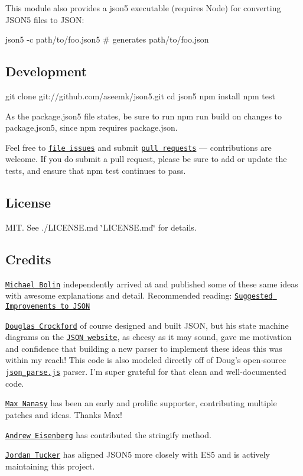 This module also provides a {\ttfamily json5} executable (requires Node) for converting J\+S\+O\+N5 files to J\+S\+ON\+:


\begin{DoxyCode}
json5 -c path/to/foo.json5    # generates path/to/foo.json
\end{DoxyCode}


\subsection*{Development}


\begin{DoxyCode}
git clone git://github.com/aseemk/json5.git
cd json5
npm install
npm test
\end{DoxyCode}


As the {\ttfamily package.\+json5} file states, be sure to run {\ttfamily npm run build} on changes to {\ttfamily package.\+json5}, since npm requires {\ttfamily package.\+json}.

Feel free to \href{https://github.com/aseemk/json5/issues}{\tt file issues} and submit \href{https://github.com/aseemk/json5/pulls}{\tt pull requests} — contributions are welcome. If you do submit a pull request, please be sure to add or update the tests, and ensure that {\ttfamily npm test} continues to pass.

\subsection*{License}

M\+IT. See ./\+L\+I\+C\+E\+N\+SE.md \char`\"{}\+L\+I\+C\+E\+N\+S\+E.\+md\char`\"{} for details.

\subsection*{Credits}

\href{http://bolinfest.com/}{\tt Michael Bolin} independently arrived at and published some of these same ideas with awesome explanations and detail. Recommended reading\+: \href{http://bolinfest.com/essays/json.html}{\tt Suggested Improvements to J\+S\+ON}

\href{http://www.crockford.com/}{\tt Douglas Crockford} of course designed and built J\+S\+ON, but his state machine diagrams on the \href{http://json.org/}{\tt J\+S\+ON website}, as cheesy as it may sound, gave me motivation and confidence that building a new parser to implement these ideas this was within my reach! This code is also modeled directly off of Doug’s open-\/source \href{https://github.com/douglascrockford/JSON-js/blob/master/json_parse.js}{\tt json\+\_\+parse.\+js} parser. I’m super grateful for that clean and well-\/documented code.

\href{https://github.com/MaxNanasy}{\tt Max Nanasy} has been an early and prolific supporter, contributing multiple patches and ideas. Thanks Max!

\href{https://github.com/aeisenberg}{\tt Andrew Eisenberg} has contributed the {\ttfamily stringify} method.

\href{https://github.com/jordanbtucker}{\tt Jordan Tucker} has aligned J\+S\+O\+N5 more closely with E\+S5 and is actively maintaining this project. 